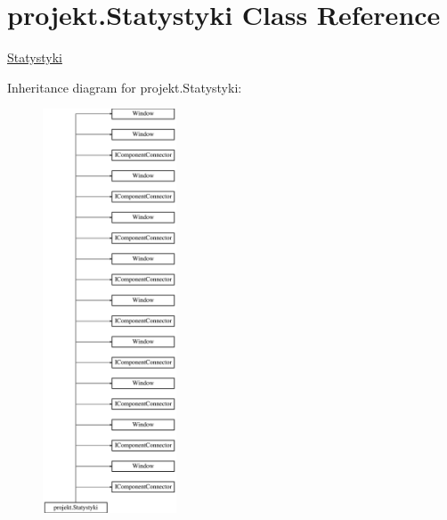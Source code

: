 \hypertarget{classprojekt_1_1_statystyki}{}\section{projekt.\+Statystyki Class Reference}
\label{classprojekt_1_1_statystyki}


\mbox{\hyperlink{classprojekt_1_1_statystyki}{Statystyki}}  


Inheritance diagram for projekt.\+Statystyki\+:\begin{figure}[H]
\begin{center}
\leavevmode
\includegraphics[height=12.000000cm]{classprojekt_1_1_statystyki}
\end{center}
\end{figure}
